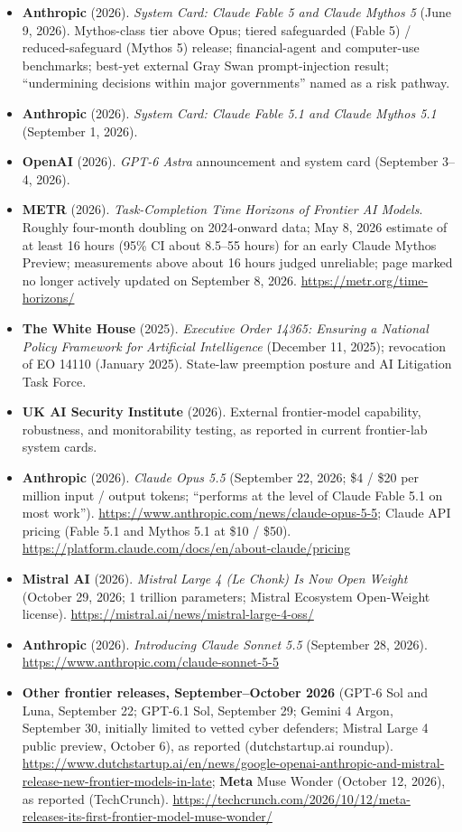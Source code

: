 \documentclass[11pt,letterpaper]{article}
\begin{document}
\begin{itemize}[leftmargin=1.5em]
  \item \textbf{Anthropic} (2026). \textit{System Card: Claude Fable 5 and Claude Mythos 5} (June 9, 2026). Mythos-class tier above Opus; tiered safeguarded (Fable 5) / reduced-safeguard (Mythos 5) release; financial-agent and computer-use benchmarks; best-yet external Gray Swan prompt-injection result; ``undermining decisions within major governments'' named as a risk pathway.
  \item \textbf{Anthropic} (2026). \textit{System Card: Claude Fable 5.1 and Claude Mythos 5.1} (September 1, 2026).
  \item \textbf{OpenAI} (2026). \textit{GPT-6 Astra} announcement and system card (September 3--4, 2026).
  \item \textbf{METR} (2026). \textit{Task-Completion Time Horizons of Frontier AI Models}. Roughly four-month doubling on 2024-onward data; May 8, 2026 estimate of at least 16 hours (95\% CI about 8.5--55 hours) for an early Claude Mythos Preview; measurements above about 16 hours judged unreliable; page marked no longer actively updated on September 8, 2026. \url{https://metr.org/time-horizons/}
  \item \textbf{The White House} (2025). \textit{Executive Order 14365: Ensuring a National Policy Framework for Artificial Intelligence} (December 11, 2025); revocation of EO 14110 (January 2025). State-law preemption posture and AI Litigation Task Force.
  \item \textbf{UK AI Security Institute} (2026). External frontier-model capability, robustness, and monitorability testing, as reported in current frontier-lab system cards.
  \item \textbf{Anthropic} (2026). \textit{Claude Opus 5.5} (September 22, 2026; \$4 / \$20 per million input / output tokens; ``performs at the level of Claude Fable 5.1 on most work''). \url{https://www.anthropic.com/news/claude-opus-5-5}; Claude API pricing (Fable 5.1 and Mythos 5.1 at \$10 / \$50). \url{https://platform.claude.com/docs/en/about-claude/pricing}
  \item \textbf{Mistral AI} (2026). \textit{Mistral Large 4 (Le Chonk) Is Now Open Weight} (October 29, 2026; 1 trillion parameters; Mistral Ecosystem Open-Weight license). \url{https://mistral.ai/news/mistral-large-4-oss/}
  \item \textbf{Anthropic} (2026). \textit{Introducing Claude Sonnet 5.5} (September 28, 2026). \url{https://www.anthropic.com/claude-sonnet-5-5}
  \item \textbf{Other frontier releases, September--October 2026} (GPT-6 Sol and Luna, September 22; GPT-6.1 Sol, September 29; Gemini 4 Argon, September 30, initially limited to vetted cyber defenders; Mistral Large 4 public preview, October 6), as reported (dutchstartup.ai roundup). \url{https://www.dutchstartup.ai/en/news/google-openai-anthropic-and-mistral-release-new-frontier-models-in-late}; \textbf{Meta} Muse Wonder (October 12, 2026), as reported (TechCrunch). \url{https://techcrunch.com/2026/10/12/meta-releases-its-first-frontier-model-muse-wonder/}
\end{itemize}
\end{document}
